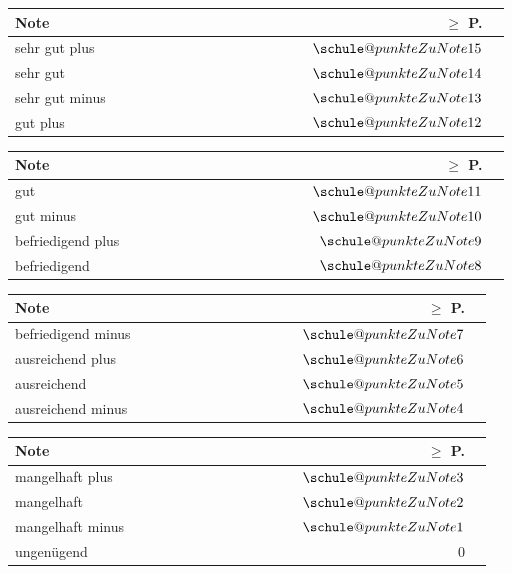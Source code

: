 {{{\begin{tabular}{|p{0.6\linewidth}|r|r|}
                \rowcolor{black!20}\textbf{Note}  &
                \textbf{$\ge$ P.}
                \\\hline
                sehr gut plus  & $\schule@punkteZuNote{15}$\\\hline
                \rowcolor{black!10}
                sehr gut  & $\schule@punkteZuNote{14}$\\\hline
                sehr gut minus  & $\schule@punkteZuNote{13}$\\\hline
                \rowcolor{black!10}
                gut plus  & $\schule@punkteZuNote{12}$\\\hline
            \end{tabular}
        }
        \parbox{.24\linewidth}{
            \tiny
            \begin{tabular}{|p{0.6\linewidth}|r|r|}\hline
                \rowcolor{black!20}\textbf{Note}  &
                \textbf{$\ge$ P.}
                \\\hline
                gut & $\schule@punkteZuNote{11}$\\\hline
                \rowcolor{black!10}
                gut minus  & $\schule@punkteZuNote{10}$ \\\hline
                befriedigend plus & $\schule@punkteZuNote{9}$\\\hline
                \rowcolor{black!10}
                befriedigend  & $\schule@punkteZuNote{8}$\\\hline
            \end{tabular}
        }
        \parbox{.24\linewidth}{
            \tiny
            \begin{tabular}{|p{0.6\linewidth}|r|r|}\hline
                \rowcolor{black!20}\textbf{Note}  &
                \textbf{$\ge$ P.}
                \\\hline
                befriedigend minus  & $\schule@punkteZuNote{7}$\\\hline
                \rowcolor{black!10}
                ausreichend plus  & $\schule@punkteZuNote{6}$\\\hline
                ausreichend & $\schule@punkteZuNote{5}$\\\hline
                \rowcolor{black!10}
                ausreichend minus & $\schule@punkteZuNote{4}$\\\hline
            \end{tabular}
        }
        \parbox{.24\linewidth}{
            \tiny
            \begin{tabular}{|p{0.6\linewidth}|r|r|}\hline
                \rowcolor{black!20}\textbf{Note}  &
                \textbf{$\ge$ P.}
                \\\hline
                mangelhaft plus & $\schule@punkteZuNote{3}$\\\hline
                \rowcolor{black!10}
                mangelhaft  & $\schule@punkteZuNote{2}$\\\hline
                mangelhaft minus & $\schule@punkteZuNote{1}$\\\hline
                \rowcolor{black!10}
                ungenügend & $0$ \\\hline
            \end{tabular}
        }
    }
}

